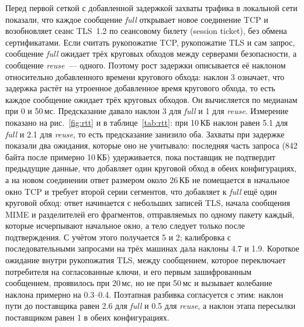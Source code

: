 \documentclass[conference,a4paper]{IEEEtran}
\newcommand{\newgreen}[1]{{\color{green!50!black}#1}}
\begin{document}
Перед первой сеткой с добавленной задержкой захваты трафика в локальной сети показали, что каждое
сообщение \emph{full} открывает новое соединение TCP и возобновляет сеанс TLS~1.2 по сеансовому
билету (session ticket), без обмена сертификатами. Если считать рукопожатие TCP, рукопожатие TLS и
сам запрос, сообщение \emph{full} ожидает трёх круговых обходов между серверами безопасности,
а сообщение \emph{reuse}~--- одного. Поэтому рост задержки описывается её наклоном
относительно добавленного времени кругового обхода: наклон 3 означает, что задержка растёт на утроенное добавленное
время кругового обхода, то есть каждое сообщение ожидает трёх круговых обходов. Он вычисляется по медианам при 0 и
50\,мс. Предсказание давало наклон 3
для \emph{full} и 1 для \emph{reuse}. Измерение показано на рис.~\ref{fig:rtt} и в таблице~\ref{tab:rtt}: при 10\,КБ
наклон равен 5.1 для \emph{full} и 2.1 для \emph{reuse}, то есть предсказание занизило оба.
Захваты при задержке показали два ожидания, которые оно не учитывало: последняя часть запроса (842 байта
после примерно 10\,КБ) удерживается, пока поставщик не подтвердит предыдущие данные, что добавляет один круговой
обход в обеих конфигурациях, а на новом соединении ответ размером около 26\,КБ не помещается в
начальное окно TCP и требует второй серии сегментов, что добавляет к \emph{full} ещё один круговой обход\newgreen{:
ответ начинается с небольших записей TLS, начала сообщения MIME и разделителей
его фрагментов, отправляемых по одному пакету каждый, которые исчерпывают начальное окно, а тело следует только
после подтверждения}. С учётом
этого получается 5 и 2; калибровка с последовательными запросами на трёх машинах дала
наклоны 4.7 и 1.9. Короткое ожидание внутри рукопожатия TLS, между сообщением, которое переключает
потребителя на согласованные ключи, и его первым зашифрованным сообщением, проявилось при 20\,мс, но не при
50\,мс и вызывает колебание наклона примерно на 0.3--0.4. Поэтапная разбивка согласуется с этим: наклон
пути до поставщика равен 2.6 для \emph{full} и 0.5 для \emph{reuse}, а наклон этапа пересылки
поставщиком равен 1 в обеих конфигурациях.
\end{document}
